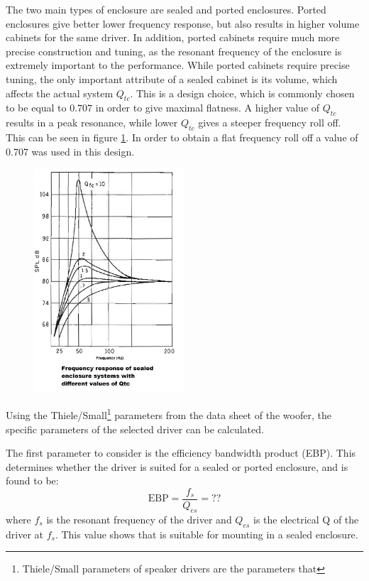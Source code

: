 \documentclass[main.tex]{subfiles}
\begin{document}
The two main types of enclosure are sealed and ported enclosures.
Ported enclosures give better lower frequency response, but also results in higher volume cabinets for the same driver.
In addition, ported cabinets require much more precise construction and tuning, as the resonant frequency of the enclosure is extremely important to the performance.
While ported cabinets require precise tuning, the only important attribute of a sealed cabinet is its volume, which affects the actual system $Q_{tc}$.
This is a design choice, which is commonly chosen to be equal to $0.707$ in order to give maximal flatness.
A higher value of $Q_{tc}$ results in a peak resonance, while lower $Q_{tc}$ gives a steeper frequency roll off.
This can be seen in figure \ref{fig:qtcplot}.
In order to obtain a flat frequency roll off a value of 0.707 was used in this design.
\begin{figure}
    \centering
    \includegraphics[width=0.5\textwidth]{figs/qtcResponsePlot.jpg}
    \caption{}
    \label{fig:qtcplot}
\end{figure}

Using the Thiele/Small\footnote{Thiele/Small parameters of speaker drivers are the parameters that } parameters from the data sheet of the woofer, the specific parameters of the selected driver can be calculated.

The first parameter to consider is the efficiency bandwidth product (EBP).
This determines whether the driver is suited for a sealed or ported enclosure, and is found to be:
\begin{equation}
    \mbox{EBP} = \frac{f_s}{Q_{es}} = ??
\end{equation}
where $f_s$ is the resonant frequency of the driver and $Q_{es}$ is the electrical Q of the driver at $f_s$.
This value shows that is suitable for mounting in a sealed enclosure.
\end{document}

